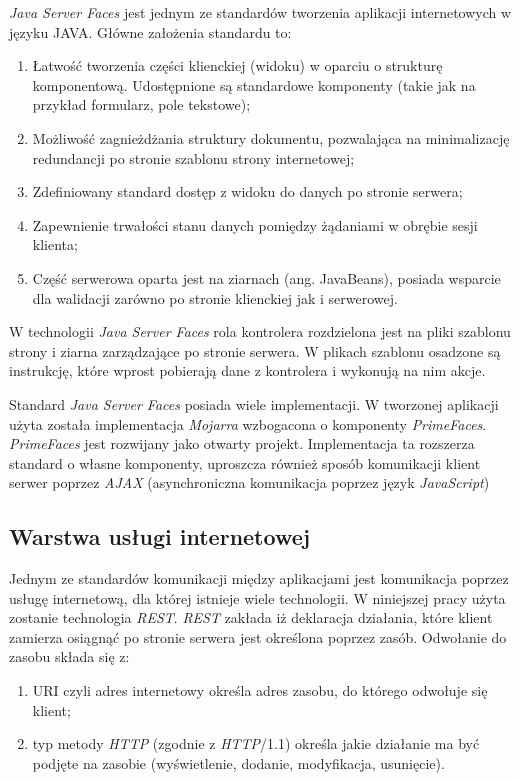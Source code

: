 \textit{Java Server Faces} jest jednym ze standardów tworzenia aplikacji internetowych w języku JAVA\cite{jsfRef}. Główne założenia standardu to:
\begin{enumerate}
  \item Łatwość tworzenia części klienckiej (widoku) w oparciu o strukturę komponentową. Udostępnione są standardowe komponenty (takie jak na przykład formularz, pole tekstowe);
  \item Możliwość zagnieżdżania struktury dokumentu, pozwalająca na minimalizację redundancji po stronie szablonu strony internetowej; 
  \item Zdefiniowany standard dostęp z widoku do danych po stronie serwera;
  \item Zapewnienie trwałości stanu danych pomiędzy żądaniami w obrębie sesji klienta;
  \item Część serwerowa oparta jest na ziarnach (ang. JavaBeans), posiada wsparcie dla walidacji zarówno po stronie klienckiej jak i serwerowej.
\end{enumerate}

W technologii \textit{Java Server Faces} rola kontrolera rozdzielona jest na pliki szablonu strony i ziarna zarządzające po stronie serwera. W plikach szablonu osadzone są instrukcję, które wprost pobierają dane z kontrolera i wykonują na nim akcje.

Standard \textit{Java Server Faces} posiada wiele implementacji. W tworzonej aplikacji użyta została implementacja \textit{Mojarra} wzbogacona o komponenty \textit{PrimeFaces}\cite{primeFaces}. \textit{PrimeFaces} jest rozwijany jako otwarty projekt. Implementacja ta rozszerza standard o własne komponenty, uproszcza również sposób komunikacji klient serwer poprzez \textit{AJAX} (asynchroniczna komunikacja poprzez język \textit{JavaScript})

\subsection{Warstwa usługi internetowej}



Jednym ze standardów komunikacji między aplikacjami jest komunikacja poprzez usługę internetową, dla której istnieje wiele technologii. W niniejszej pracy użyta zostanie technologia \textit{REST}. \textit{REST} zakłada iż deklaracja działania, które klient zamierza osiągnąć po stronie serwera jest określona poprzez zasób. Odwołanie do zasobu składa się z:
\begin{enumerate}
  \item URI czyli adres internetowy określa adres zasobu, do którego odwołuje się klient;
  \item  typ metody \textit{HTTP} (zgodnie z \textit{HTTP}/1.1) określa jakie działanie ma być podjęte na zasobie (wyświetlenie, dodanie, modyfikacja, usunięcie).
\end{enumerate}

